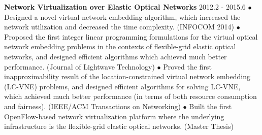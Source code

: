 \documentclass[line,11pt,letter]{F:/Dropbox (Personal)/personal-stuffs/CV/LaTeX/includes/cls/myRes}
\begin{document}
\begin{resume}
{}
{\setlength{\parskip}{0pt}
{\bf Network Virtualization over Elastic Optical Networks} \hfill 2012.2 - 2015.6\break
{\hspace*{1em} $\bullet$ Designed a novel virtual network embedding algorithm, which increased the network utilization and decreased the time complexity. (INFOCOM 2014)\hfill\break}
{\hspace*{1em} $\bullet$ Proposed the first integer linear programming formulations for the virtual optical network embedding problems in the contexts of flexible-grid elastic optical networks, and designed efficient algorithms which achieved much better performance. (Journal of Lightwave Technology)\hfill\break}
{\hspace*{1em} $\bullet$ Proved the first inapproximability result of the location-constrained virtual network embedding (LC-VNE) problems, and designed efficient algorithms for solving LC-VNE, which achieved much better performance (in terms of both resource consumption and fairness). (IEEE/ACM Transactions on Networking)\hfill\break}
{\hspace*{1em} $\bullet$ Built the first OpenFlow-based network virtualization platform where the underlying infrastructure is the flexible-grid elastic optical networks. (Master Thesis)\hfill\break}
}
\negspace

\end{resume}
\end{document}
